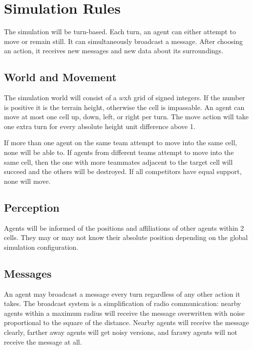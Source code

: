 \section{Simulation Rules}
\label{rules}

The simulation will be turn-based. Each turn, an agent can either attempt to move or remain still. It can simultaneously broadcast a message. After choosing an action, it receives new messages and new data about its surroundings.

\subsection{World and Movement}

The simulation world will consist of a $w$x$h$ grid of signed integers. If the number is positive it is the terrain height, otherwise the cell is impassable. An agent can move at most one cell up, down, left, or right per turn. The move action will take one extra turn for every absolute height unit difference above 1.

If more than one agent on the same team attempt to move into the same cell, none will be able to. If agents from different teams attempt to move into the same cell, then the one with more teammates adjacent to the target cell will succeed and the others will be destroyed. If all competitors have equal support, none will move.

\subsection{Perception}

Agents will be informed of the positions and affiliations of other agents within 2 cells. They may or may not know their absolute position depending on the global simulation configuration.

\subsection{Messages}

An agent may broadcast a message every turn regardless of any other action it takes. The broadcast system is a simplification of radio communication: nearby agents within a maximum radius will receive the message overwritten with noise proportional to the square of the distance. Nearby agents will receive the message clearly, farther away agents will get noisy versions, and farawy agents will not receive the message at all.